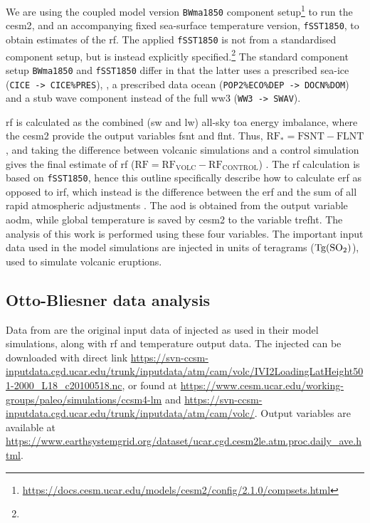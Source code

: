 \documentclass{ametsocV6.1}
\newcommand{\iso}[1][i]{{#1}njected \ce{SO2}}
\begin{document}
We are using the coupled model version \texttt{BWma1850} component
setup\footnote{\url{https://docs.cesm.ucar.edu/models/cesm2/config/2.1.0/compsets.html}}
to run the \gls{cesm2}, and an accompanying fixed sea-surface temperature version,
\texttt{fSST1850}, to obtain estimates of the \gls{rf}. The applied \texttt{fSST1850} is
not from a standardised component setup, but is instead explicitly
specified.\footnote{\fssturl} The standard component setup \texttt{BWma1850} and
\texttt{fSST1850} differ in that the latter uses a prescribed sea-ice (\texttt{CICE ->
  CICE\%PRES}), , a prescribed data ocean (\texttt{POP2\%ECO\%DEP -> DOCN\%DOM}) and a
stub wave component instead of the full \gls{ww3} (\texttt{WW3 -> SWAV}).

\gls{rf} is calculated as the combined (\gls{sw} and \gls{lw}) all-sky \gls{toa} energy
imbalance, where the \gls{cesm2} provide the output variables \gls{fsnt} and \gls{flnt}.
Thus, \(\mathrm{RF_*}= \mathrm{FSNT} - \mathrm{FLNT}\), and taking the difference
between volcanic simulations and a control simulation gives the final estimate of
\gls{rf} (\(\mathrm{RF}=\mathrm{RF_{VOLC}}-\mathrm{RF_{CONTROL}}\))
\citep{marshall2020}. The \gls{rf} calculation is based on \texttt{fSST1850}, hence this
outline specifically describe how to calculate \gls{erf} as opposed to \gls{irf}, which
instead is the difference between the \gls{erf} and the sum of all rapid atmospheric
adjustments \citep{marshall2020,smith2018}. The \gls{aod} is obtained from the output
variable \gls{aodm}, while global temperature is saved by \gls{cesm2} to the variable
\gls{trefht}. The analysis of this work is performed using these four variables. The
important input data used in the model simulations are \iso{} in units of teragrams
(\(\si{\tera\gram(\ce{SO2})}\)), used to simulate volcanic eruptions.

\appendix[B]


\subsection{Otto-Bliesner data analysis}\label{ap:ob16}

Data from \citet{ottobliesner2016} are the original input data of \iso{} as used in
their model simulations, along with \gls{rf} and temperature output data. The \iso{} can
be downloaded with direct link
\url{https://svn-ccsm-inputdata.cgd.ucar.edu/trunk/inputdata/atm/cam/volc/IVI2LoadingLatHeight501-2000_L18_c20100518.nc},
or found at \url{https://www.cesm.ucar.edu/working-groups/paleo/simulations/ccsm4-lm}
and \url{https://svn-ccsm-inputdata.cgd.ucar.edu/trunk/inputdata/atm/cam/volc/}. Output
variables are available at
\url{https://www.earthsystemgrid.org/dataset/ucar.cgd.cesm2le.atm.proc.daily_ave.html}.
\end{document}
